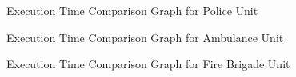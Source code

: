 \begin{figure}[H]
    \centering
    \caption{Execution Time Comparison Graph for Police Unit}
    \label{fig:v_bp_ambulance}
\end{figure}

\begin{figure}[H]
    \centering
    \caption{Execution Time Comparison Graph for Ambulance Unit}
    \label{fig:v_bp_ambulance}
\end{figure}

\begin{figure}[H]
    \centering
    \caption{Execution Time Comparison Graph for Fire Brigade Unit}
    \label{fig:v_bp_ambulance}
\end{figure}

